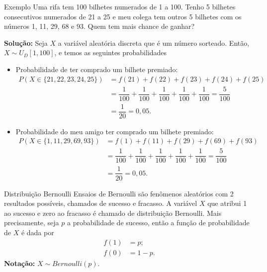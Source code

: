 \documentclass[9pt]{beamer}
\begin{document}
\begin{frame}{Exemplo}
Uma rifa tem 100 bilhetes numerados de 1 a 100. Tenho 5 bilhetes consecutivos numerados de 21 a 25 e meu colega tem outros 5 bilhetes com os números 1, 11, 29, 68 e 93. Quem tem mais chance de ganhar?
\vfill

\textbf{Solução:} Seja $X$ a variável aleatória discreta que é um número sorteado. Então, $X \sim U_D[1,100]$, e temos as seguintes probabilidades
\begin{itemize}
 \item Probabilidade de ter comprado um bilhete premiado:
 \begin{align*}
  P(X \in \{21,22,23,24,25\}) &= f(21)+f(22) + f(23) +f(24)+f(25)\\
  &= \dfrac{1}{100} +\dfrac{1}{100} +\dfrac{1}{100} +\dfrac{1}{100} +\dfrac{1}{100} = \dfrac{5}{100}\\
  &= \dfrac{1}{20}=0,05.
 \end{align*}
 \item Probabilidade do meu amigo ter comprado um bilhete premiado:
 \begin{align*}
  P(X \in \{1,11,29,69,93\}) &= f(1)+f(11) + f(29) +f(69)+f(93)\\
  &= \dfrac{1}{100} +\dfrac{1}{100} +\dfrac{1}{100} +\dfrac{1}{100} +\dfrac{1}{100} = \dfrac{5}{100}\\
  &= \dfrac{1}{20}=0,05.
 \end{align*}

\end{itemize}

\end{frame}

\begin{frame}{Distribuição Bernoulli}
Ensaios de Bernoulli são fenômenos aleatórios com 2 resultados possíveis, chamados de sucesso e fracasso. A variável $X$ que atribui 1 ao sucesso e zero ao fracasso é chamado de distribuição Bernoulli.
Mais precisamente, seja $p$ a probabilidade de sucesso, então a função de probabilidade de $X$ é dada por
\begin{align*}
f(1) &= p;\\
f(0) &= 1-p.
\end{align*}
\textbf{Notação:} $X \sim Bernoulli(p)$.
\end{frame}
\end{document}
